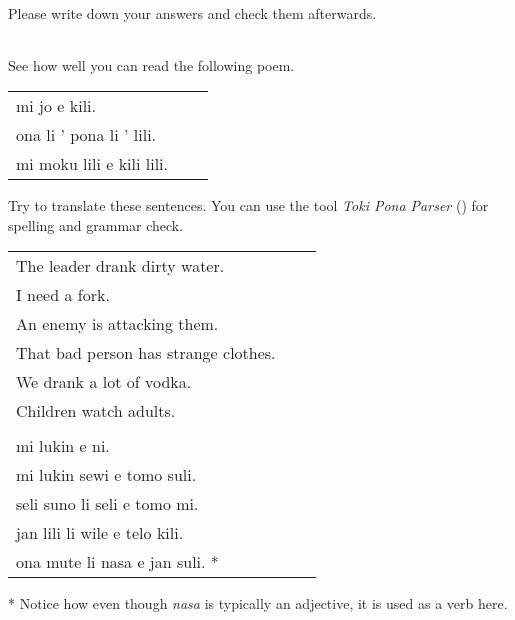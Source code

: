 Please write down your answers and check them afterwards. 


\begin{supertabular}{p{5,5cm}|ll}



	
\end{supertabular}

See how well you can read the following poem. 

\begin{supertabular}{p{5,5cm}|ll}
mi jo e kili. && \\ %
ona li ' pona li ' lili. && \\ %
mi moku lili e kili lili. && \\ %
\end{supertabular} 

Try to translate these sentences. 
You can use the tool \textit{Toki Pona Parser} (\cite{www:rowa:02}) for spelling and grammar check. 

\begin{supertabular}{p{5,5cm}|ll}
The leader drank dirty water. &&   \\ %
I need a fork.   &&   \\ %
An enemy is attacking them.   &&   \\ %
That bad person has strange clothes.   &&  \\  %
We drank a lot of vodka.   &&   \\ %
Children watch adults.   &&   \\ %
 && \\ %
mi lukin e ni. &&  \\ %
mi lukin sewi e tomo suli.  &&    \\ %
seli suno li seli e tomo mi.  &&   \\ %
jan lili li wile e telo kili.  &&  \\ %
ona mute li nasa e jan suli. * &&  \\ %
\end{supertabular} 

* Notice how even though \textit{nasa} is typically an adjective, it is used as a verb here. 
